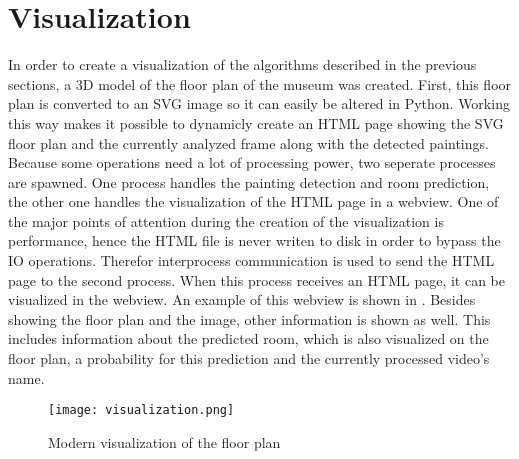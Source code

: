 \section{Visualization}

In order to create a visualization of the algorithms described in the previous sections, a 3D model of the floor plan of the museum was created. First, this floor plan is converted to an SVG image so it can easily be altered in Python. Working this way makes it possible to dynamicly create an HTML page showing the SVG floor plan and the currently analyzed frame along with the detected paintings. Because some operations need a lot of processing power, two seperate processes are spawned. One process handles the painting detection and room prediction, the other one handles the visualization of the HTML page in a webview. One of the major points of attention during the creation of the visualization is performance, hence the HTML file is never writen to disk in order to bypass the IO operations. Therefor interprocess communication is used to send the HTML page to the second process. When this process receives an HTML page, it can be visualized in the webview. An example of this webview is shown in . Besides showing the floor plan and the image, other information is shown as well. This includes information about the predicted room, which is also visualized on the floor plan, a probability for this prediction and the currently processed video's name.

\begin{figure}
    \centering
    \texttt{[image: visualization.png]}
    \label{fig:webview}
    \caption{Modern visualization of the floor plan}
\end{figure}
